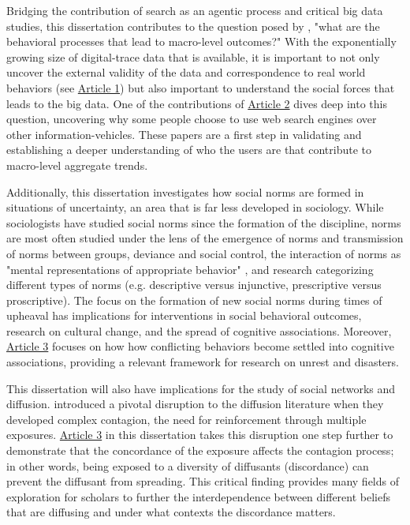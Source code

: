 Bridging the contribution of search as an agentic process 
and critical big data studies, this dissertation contributes to the question posed by 
\citet{breigerScaling2015}, "what are the behavioral processes that 
lead to macro-level outcomes?" With the exponentially growing size of digital-trace data
that is available, it is important to not only uncover the external validity of 
the data and correspondence to real world behaviors (see \hyperlink{paper-1}{Article 1})
but also important to understand the social forces that leads to the big data. 
One of the contributions of \hyperlink{paper-2}{Article 2} dives deep
into this question, uncovering why some people choose to use web search engines over other
information-vehicles. These papers are a first step in validating and establishing
a deeper understanding of who the users are that contribute to macro-level aggregate trends. 

Additionally, this dissertation investigates how social norms are
formed in situations of uncertainty, an area that is far less developed in
sociology. While sociologists have studied social norms since the
formation of the discipline, norms are most often studied under the lens
of the emergence of norms and transmission of norms between groups, 
deviance and social control, the interaction of norms as "mental representations of appropriate behavior" \citep{aarts2003silence}, and research categorizing different types of norms (e.g. descriptive versus injunctive, prescriptive versus proscriptive).  
The focus on the formation of new social norms during times of upheaval 
has implications for interventions in social behavioral outcomes, 
research on cultural change, and the spread of cognitive associations. 
Moreover, \hyperlink{paper-3}{Article 3} focuses on how how conflicting
behaviors become settled into cognitive associations, providing
a relevant framework for research on unrest and disasters.

This dissertation will also have implications for the study of social
networks and diffusion. \citet{centolaComplexContagionsWeakness2007}
introduced a pivotal disruption to the diffusion literature when
they developed complex contagion, the need for reinforcement through multiple
exposures.  \hyperlink{paper-3}{Article 3} in this dissertation
takes this disruption one step further to demonstrate that the concordance
of the exposure affects the contagion process; in other words, being exposed to a 
diversity of diffusants (discordance) can prevent the diffusant from spreading. 
This critical finding provides many fields of exploration for scholars 
to further the interdependence between different beliefs that are diffusing and
under what contexts the discordance matters. 

